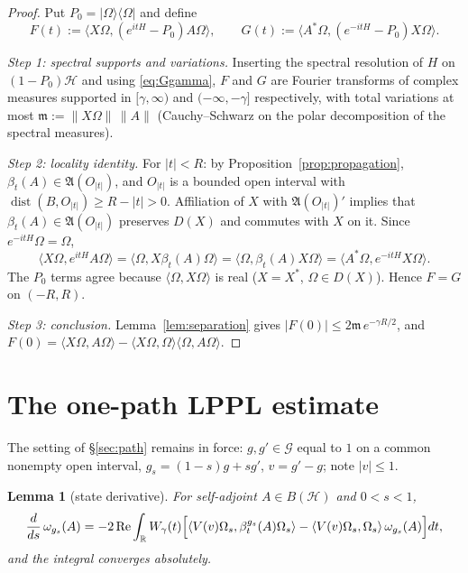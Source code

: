 \documentclass[11pt,a4paper]{article}
\theoremstyle{plain}
\newtheorem{lemma}[theorem]{Lemma}
\theoremstyle{definition}
\theoremstyle{plain}
\theoremstyle{definition}
\newcommand{\R}{\mathbb{R}}
\newcommand{\A}{\mathfrak{A}}
\newcommand{\G}{\mathcal{G}}
\newcommand{\HH}{\mathcal{H}}
\newcommand{\Om}{\Omega}
\newcommand{\ip}[2]{\langle #1,#2\rangle}
\DeclareMathOperator{\dist}{dist}
\begin{document}
\begin{proof}
Put $P_0=|\Om\rangle\langle\Om|$ and define
\[
 F(t):=\ip{X\Om}{(e^{itH}-P_0)A\Om},\qquad
 G(t):=\ip{A^*\Om}{(e^{-itH}-P_0)X\Om} .
\]

\emph{Step 1: spectral supports and variations.} Inserting the spectral resolution of $H$
on $(1-P_0)\HH$ and using \eqref{eq:Ggamma}, $F$ and $G$ are Fourier transforms of complex
measures supported in $[\gamma,\infty)$ and $(-\infty,-\gamma]$ respectively, with total
variations at most $\mathfrak m:=\|X\Om\|\,\|A\|$ (Cauchy--Schwarz on the polar
decomposition of the spectral measures).

\emph{Step 2: locality identity.} For $|t|<R$: by
Proposition~\ref{prop:propagation}, $\beta_t(A)\in\A(O_{|t|})$, and $O_{|t|}$ is a bounded
open interval with $\dist(B,O_{|t|})\ge R-|t|>0$. Affiliation of $X$ with $\A(O_{|t|})'$
implies that $\beta_t(A)\in\A(O_{|t|})$ preserves $D(X)$ and commutes with $X$ on it.
Since $e^{-itH}\Om=\Om$,
\[
 \ip{X\Om}{e^{itH}A\Om}
 =\ip{\Om}{X\beta_t(A)\Om}
 =\ip{\Om}{\beta_t(A)X\Om}
 =\ip{A^*\Om}{e^{-itH}X\Om} .
\]
The $P_0$ terms agree because $\ip{\Om}{X\Om}$ is real ($X=X^*$, $\Om\in D(X)$). Hence
$F=G$ on $(-R,R)$.

\emph{Step 3: conclusion.} Lemma~\ref{lem:separation} gives
$|F(0)|\le2\mathfrak m\,e^{-\gamma R/2}$, and
$F(0)=\ip{X\Om}{A\Om}-\ip{X\Om}{\Om}\ip{\Om}{A\Om}$.
\end{proof}

\section{The one-path LPPL estimate}\label{sec:lppl}

The setting of \S\ref{sec:path} remains in force: $g,g'\in\G$ equal to $1$ on a common
nonempty open interval, $g_s=(1-s)g+sg'$, $v=g'-g$; note $|v|\le1$.

\begin{lemma}[state derivative]\label{lem:statederiv}
For self-adjoint $A\in B(\HH)$ and $0<s<1$,
\begin{equation}
 \frac d{ds}\,\omega_{g_s}(A)
 =-2\,\mathrm{Re}\int_\R W_\gamma(t)
 \Bigl[\ip{V(v)\Om_s}{\beta^{g_s}_t(A)\Om_s}
 -\ip{V(v)\Om_s}{\Om_s}\,\omega_{g_s}(A)\Bigr]dt ,
 \label{eq:statederiv}
\end{equation}
and the integral converges absolutely.
\end{lemma}
\end{document}
